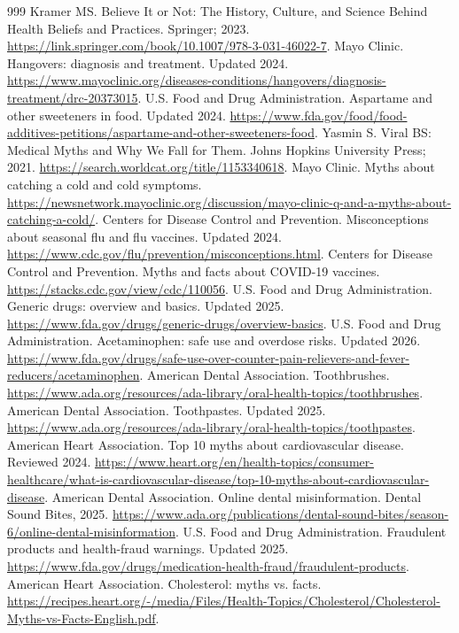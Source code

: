 \documentclass[11pt,oneside]{book}
\begin{document}
\begin{thebibliography}{999}
Kramer MS. Believe It or Not: The History, Culture, and Science Behind Health Beliefs and Practices. Springer; 2023. \url{https://link.springer.com/book/10.1007/978-3-031-46022-7}.
Mayo Clinic. Hangovers: diagnosis and treatment. Updated 2024. \url{https://www.mayoclinic.org/diseases-conditions/hangovers/diagnosis-treatment/drc-20373015}.
U.S. Food and Drug Administration. Aspartame and other sweeteners in food. Updated 2024. \url{https://www.fda.gov/food/food-additives-petitions/aspartame-and-other-sweeteners-food}.
Yasmin S. Viral BS: Medical Myths and Why We Fall for Them. Johns Hopkins University Press; 2021. \url{https://search.worldcat.org/title/1153340618}.
Mayo Clinic. Myths about catching a cold and cold symptoms. \url{https://newsnetwork.mayoclinic.org/discussion/mayo-clinic-q-and-a-myths-about-catching-a-cold/}.
Centers for Disease Control and Prevention. Misconceptions about seasonal flu and flu vaccines. Updated 2024. \url{https://www.cdc.gov/flu/prevention/misconceptions.html}.
Centers for Disease Control and Prevention. Myths and facts about COVID-19 vaccines. \url{https://stacks.cdc.gov/view/cdc/110056}.
U.S. Food and Drug Administration. Generic drugs: overview and basics. Updated 2025. \url{https://www.fda.gov/drugs/generic-drugs/overview-basics}.
U.S. Food and Drug Administration. Acetaminophen: safe use and overdose risks. Updated 2026. \url{https://www.fda.gov/drugs/safe-use-over-counter-pain-relievers-and-fever-reducers/acetaminophen}.
American Dental Association. Toothbrushes. \url{https://www.ada.org/resources/ada-library/oral-health-topics/toothbrushes}.
American Dental Association. Toothpastes. Updated 2025. \url{https://www.ada.org/resources/ada-library/oral-health-topics/toothpastes}.
American Heart Association. Top 10 myths about cardiovascular disease. Reviewed 2024. \url{https://www.heart.org/en/health-topics/consumer-healthcare/what-is-cardiovascular-disease/top-10-myths-about-cardiovascular-disease}.
American Dental Association. Online dental misinformation. Dental Sound Bites, 2025. \url{https://www.ada.org/publications/dental-sound-bites/season-6/online-dental-misinformation}.
U.S. Food and Drug Administration. Fraudulent products and health-fraud warnings. Updated 2025. \url{https://www.fda.gov/drugs/medication-health-fraud/fraudulent-products}.
American Heart Association. Cholesterol: myths vs. facts. \url{https://recipes.heart.org/-/media/Files/Health-Topics/Cholesterol/Cholesterol-Myths-vs-Facts-English.pdf}.

\end{thebibliography}
\end{document}

